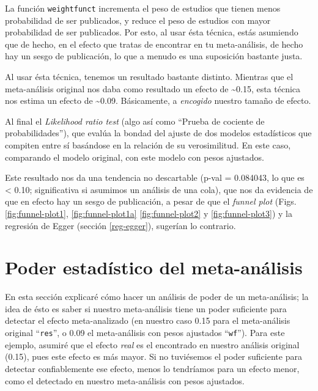 \documentclass[
  bookmarksnumbered]{article}
\begin{document}
La función \texttt{weightfunct} incrementa el peso de estudios que tienen menos probabilidad de ser publicados, y reduce el peso de estudios con mayor probabilidad de ser publicados. Por esto, al usar ésta técnica, estás asumiendo que de hecho, en el efecto que tratas de encontrar en tu meta-análisis, de hecho hay un sesgo de publicación, lo que a menudo es una suposición bastante justa.

Al usar ésta técnica, tenemos un resultado bastante distinto. Mientras que el meta-análisis original nos daba como resultado un efecto de \textasciitilde0.15, esta técnica nos estima un efecto de \textasciitilde0.09. Básicamente, a \emph{encogido} nuestro tamaño de efecto.

Al final el \emph{Likelihood ratio test} (algo así como ``Prueba de cociente de probabilidades''), que evalúa la bondad del ajuste de dos modelos estadísticos que compiten entre sí basándose en la relación de su verosimilitud. En este caso, comparando el modelo original, con este modelo con pesos ajustados.

Este resultado nos da una tendencia no descartable (p-val = 0.084043, lo que es \textless{} 0.10; significativa si asumimos un análisis de una cola), que nos da evidencia de que en efecto hay un sesgo de publicación, a pesar de que el \emph{funnel plot} (Figs. \ref{fig:funnel-plot1}, \ref{fig:funnel-plot1a} \ref{fig:funnel-plot2} y \ref{fig:funnel-plot3}) y la regresión de Egger (sección \ref{reg-egger}), sugerían lo contrario.

\hypertarget{poder-estaduxedstico-del-meta-anuxe1lisis}{%
\section{Poder estadístico del meta-análisis}\label{poder-estaduxedstico-del-meta-anuxe1lisis}}

En esta sección explicaré cómo hacer un análisis de poder de un meta-análisis; la idea de ésto es saber si nuestro meta-análisis tiene un poder suficiente para detectar el efecto meta-analizado (en nuestro caso 0.15 para el meta-análisis original ``\texttt{res}'', o 0.09 el meta-análisis con pesos ajustados ``\texttt{wf}''). Para este ejemplo, asumiré que el efecto \emph{real} es el encontrado en nuestro análisis original (0.15), pues este efecto es más mayor. Si no tuviésemos el poder suficiente para detectar confiablemente ese efecto, menos lo tendríamos para un efecto menor, como el detectado en nuestro meta-análisis con pesos ajustados.
\end{document}
